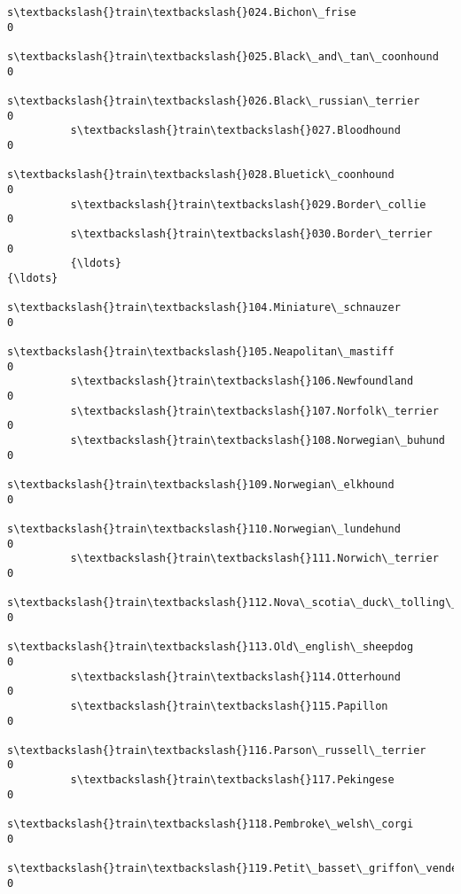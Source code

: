 \documentclass[11pt]{article}
\begin{document}
\begin{Verbatim}[commandchars=\\\{\}]
          s\textbackslash{}train\textbackslash{}024.Bichon\_frise                                        0   
          s\textbackslash{}train\textbackslash{}025.Black\_and\_tan\_coonhound                             0   
          s\textbackslash{}train\textbackslash{}026.Black\_russian\_terrier                               0   
          s\textbackslash{}train\textbackslash{}027.Bloodhound                                          0   
          s\textbackslash{}train\textbackslash{}028.Bluetick\_coonhound                                  0   
          s\textbackslash{}train\textbackslash{}029.Border\_collie                                       0   
          s\textbackslash{}train\textbackslash{}030.Border\_terrier                                      0   
          {\ldots}                                                           {\ldots}   
          s\textbackslash{}train\textbackslash{}104.Miniature\_schnauzer                                 0   
          s\textbackslash{}train\textbackslash{}105.Neapolitan\_mastiff                                  0   
          s\textbackslash{}train\textbackslash{}106.Newfoundland                                        0   
          s\textbackslash{}train\textbackslash{}107.Norfolk\_terrier                                     0   
          s\textbackslash{}train\textbackslash{}108.Norwegian\_buhund                                    0   
          s\textbackslash{}train\textbackslash{}109.Norwegian\_elkhound                                  0   
          s\textbackslash{}train\textbackslash{}110.Norwegian\_lundehund                                 0   
          s\textbackslash{}train\textbackslash{}111.Norwich\_terrier                                     0   
          s\textbackslash{}train\textbackslash{}112.Nova\_scotia\_duck\_tolling\_retriever                  0   
          s\textbackslash{}train\textbackslash{}113.Old\_english\_sheepdog                                0   
          s\textbackslash{}train\textbackslash{}114.Otterhound                                          0   
          s\textbackslash{}train\textbackslash{}115.Papillon                                            0   
          s\textbackslash{}train\textbackslash{}116.Parson\_russell\_terrier                              0   
          s\textbackslash{}train\textbackslash{}117.Pekingese                                           0   
          s\textbackslash{}train\textbackslash{}118.Pembroke\_welsh\_corgi                                0   
          s\textbackslash{}train\textbackslash{}119.Petit\_basset\_griffon\_vendeen                        0   

\end{Verbatim}
\end{document}
